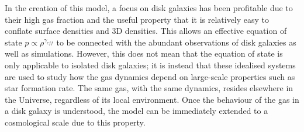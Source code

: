 In the creation of this model, a focus on disk galaxies has been profitable due to their high gas fraction and the useful property that it is relatively easy \citep{schaye2004} to conflate surface densities and 3D densities.
This allows an effective equation of state $p \propto \rho^{\gamma_{eff}}$ to be connected with the abundant observations of disk galaxies as well as simulations.
However, this does not mean that the equation of state is only applicable to isolated disk galaxies; it is instead that these idealised systems are used to study how the gas dynamics depend on large-scale properties such as star formation rate.
The same gas, with the same dynamics, resides elsewhere in the Universe, regardless of its local environment.
Once the behaviour of the gas in a disk galaxy is understood, the model can be immediately extended to a cosmological scale due to this property.
